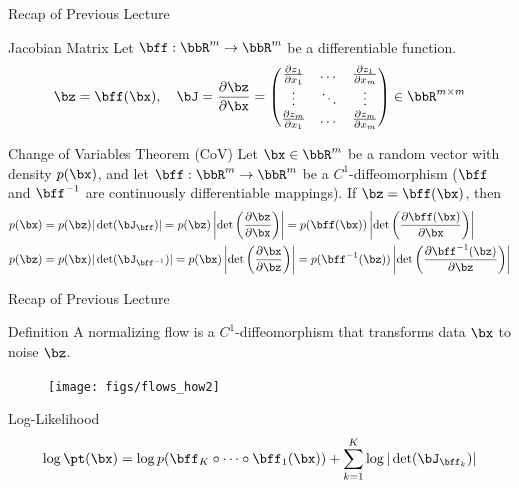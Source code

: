 \documentclass{beamer}
\begin{document}
\begin{frame}
	\titlepage
	\resetonslide
\end{frame}
\begin{frame}{Recap of Previous Lecture}
    \begin{block}{Jacobian Matrix}
		Let $\bff: \bbR^m \rightarrow \bbR^m$ be a differentiable function.
		\[
			\bz = \bff(\bx), \quad 
			\bJ =  \frac{\partial \bz}{\partial \bx} =
			\begin{pmatrix}
				\frac{\partial z_1}{\partial x_1} & \dots & \frac{\partial z_1}{\partial x_m} \\
				\vdots & \ddots & \vdots \\ 
				\frac{\partial z_m}{\partial x_1} & \dots & \frac{\partial z_m}{\partial x_m}
			\end{pmatrix} \in \bbR^{m \times m}
		\]
		\vspace{-0.3cm}
	\end{block}
	\begin{block}{Change of Variables Theorem (CoV)}
		Let $\bx\in \bbR^m$ be a random vector with density $p(\bx)$, and let $\bff: \bbR^m \rightarrow \bbR^m$ be a $C^1$-diffeomorphism ($\bff$ and $\bff^{-1}$ are continuously differentiable mappings). 
		If $\bz = \bff(\bx)$, then
		\begin{align*}
			p(\bx) &= p(\bz) |\det(\bJ_{\bff})| = p(\bz) \left|\det \left( \frac{\partial \bz}{\partial \bx} \right) \right| 
			= p(\bff(\bx)) \left|\det \left(  \frac{\partial \bff(\bx)}{\partial \bx} \right) \right| \\
			p(\bz) &= p(\bx) |\det(\bJ_{\bff^{-1}})| = p(\bx) \left|\det \left(  \frac{\partial \bx}{\partial \bz} \right) \right| 
			= p(\bff^{-1}(\bz)) \left|\det \left(  \frac{\partial \bff^{-1}(\bz)}{\partial \bz} \right) \right|
		\end{align*}
		\vspace{-0.5cm}
	\end{block}
\end{frame}
\begin{frame}{Recap of Previous Lecture}
	\begin{block}{Definition}
		A normalizing flow is a $C^1$-diffeomorphism that transforms data $\bx$ to noise $\bz$.
	\end{block}
	\vspace{-0.1cm}
	\begin{figure}
		\texttt{[image: figs/flows\_how2]}
	\end{figure}
	\vspace{-0.5cm}
	\begin{block}{Log-Likelihood}
		\vspace{-0.5cm}
		\[
			\log \pt(\bx) = \log p(\bff_K \circ \cdots \circ \bff_1(\bx)) + \sum_{k=1}^K\log |\det (\bJ_{\bff_k})|
		\]
	\end{block}
\end{frame}
\end{document}
